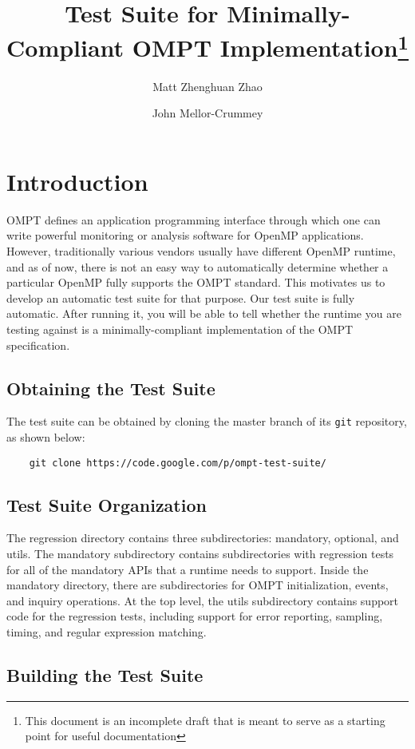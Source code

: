 \documentclass{article}
\title{Test Suite for Minimally-Compliant OMPT Implementation\thanks{This document is an incomplete draft that is meant to serve as a starting point for useful documentation}}
\author{ 
Matt Zhenghuan Zhao \and John Mellor-Crummey}
\begin{document}
     
\pagestyle{empty}

\setcounter{page}{1}
\pagestyle{plain}
                                           
\maketitle
\section{Introduction}
OMPT defines an application programming interface through which one can write powerful  monitoring or analysis software
for OpenMP applications. However, traditionally various vendors usually have different OpenMP runtime, and as of now,
there is not an easy way to automatically determine whether a particular OpenMP fully supports the OMPT standard.
This motivates us to develop an automatic test suite for that purpose. Our test suite is fully automatic. After running it,
you will be able to tell whether the runtime you are testing against is a minimally-compliant implementation of the OMPT 
specification. 


\subsection{Obtaining the Test Suite}
The test suite can be obtained by cloning the master branch of its {\tt git} repository, as shown below:
\begin{verbatim}
    git clone https://code.google.com/p/ompt-test-suite/
\end{verbatim}

    

\subsection{Test Suite Organization}
The regression directory contains three subdirectories: mandatory,  optional, and utils. The mandatory subdirectory  contains subdirectories with regression tests  for all of the mandatory APIs that a runtime needs to support. Inside the mandatory directory, there are subdirectories for OMPT  initialization, events, and inquiry operations. At the top level, the utils subdirectory contains support code for the regression tests, including support for error reporting, sampling, timing, and regular expression matching.


\subsection{Building the Test Suite}
\end{document}
